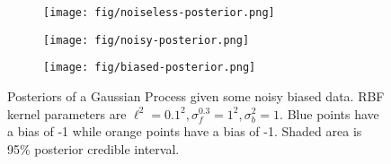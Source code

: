 \begin{figure}
    \centering
    \begin{subfigure}[b]{0.3\textwidth}
        \centering
        \texttt{[image: fig/noiseless-posterior.png]}
        \caption{}
        \label{subfig:noiseless-post}
    \end{subfigure}
    \hfill
    \begin{subfigure}[b]{0.3\textwidth}
        \centering
        \texttt{[image: fig/noisy-posterior.png]}
        \caption{}
        \label{subfig:noisy-posterior}
    \end{subfigure}
    \hfill
    \begin{subfigure}[b]{0.3\textwidth}
        \centering
        \texttt{[image: fig/biased-posterior.png]}
        \caption{}
        \label{subfig:biased-posterior}
    \end{subfigure}
    \hfill
    \caption{Posteriors of a Gaussian Process given some noisy biased data.
        RBF kernel parameters are $\ell^{2} = 0.1^2, \sigma^{0.3}_f = 1 ^ 2, \sigma^2_b = 1$.
        Blue points have a bias of -1 while orange points have a bias of -1.
        Shaded area is 95\% posterior credible interval.
    }
    \label{fig:gp-posteriors}
\end{figure}
